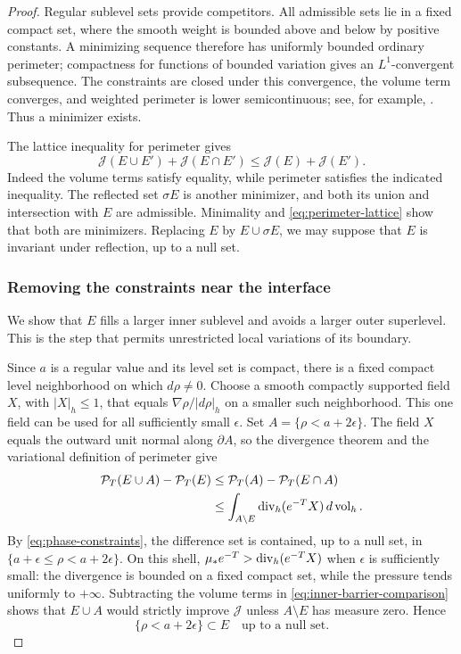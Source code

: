 \begin{proof}
Regular sublevel sets provide competitors.  All admissible sets lie
in a fixed compact set, where the smooth weight is bounded above and
below by positive constants.  A minimizing sequence therefore has
uniformly bounded ordinary perimeter; compactness for functions of
bounded variation gives an $L^1$-convergent subsequence.  The constraints
are closed under this convergence, the volume term converges, and
weighted perimeter is lower semicontinuous; see, for example,
\cite{Maggi2012}.  Thus a minimizer exists.

The lattice inequality for perimeter gives
\begin{equation}\label{eq:perimeter-lattice}
 \mathcal J(E\cup E')+\mathcal J(E\cap E')
 \le\mathcal J(E)+\mathcal J(E').
\end{equation}
Indeed the volume terms satisfy equality, while perimeter satisfies
the indicated inequality.  The reflected set $\sigma E$ is another
minimizer, and both its union and intersection with $E$ are admissible.
Minimality and \eqref{eq:perimeter-lattice} show that both are minimizers.
Replacing $E$ by $E\cup\sigma E$, we may suppose that $E$ is invariant
under reflection, up to a null set.

\subsubsection*{Removing the constraints near the interface}
We show that $E$ fills a larger inner sublevel and avoids a larger
outer superlevel.  This is the step that permits unrestricted local
variations of its boundary.

Since $a$ is a regular value and its level set is compact, there is a
fixed compact level neighborhood on which $d\rho\ne0$.  Choose a smooth
compactly supported field $X$, with $|X|_h\le1$, that equals
$\nabla\rho/|d\rho|_h$ on a smaller such neighborhood.  This one field
can be used for all sufficiently small $\epsilon$.  Set
$A=\{\rho<a+2\epsilon\}$.  The field $X$ equals the outward unit normal
along $\partial A$, so the divergence theorem and the variational
definition of perimeter give
\begin{align}
 \mathcal P_T(E\cup A)-\mathcal P_T(E)
 &\le\mathcal P_T(A)-\mathcal P_T(E\cap A)\notag\\
 &\le\int_{A\setminus E}\operatorname{div}_h(e^{-T}X)\,d\operatorname{vol}_h.
 \label{eq:inner-barrier-comparison}
\end{align}
By \eqref{eq:phase-constraints}, the difference set is contained, up
to a null set, in $\{a+\epsilon\le\rho<a+2\epsilon\}$.  On this shell,
$\mu_*e^{-T}>\operatorname{div}_h(e^{-T}X)$ when $\epsilon$ is sufficiently small:
the divergence is bounded on a fixed compact set, while the pressure
tends uniformly to $+\infty$.  Subtracting the volume terms in
\eqref{eq:inner-barrier-comparison} shows that $E\cup A$ would strictly
improve $\mathcal J$ unless $A\setminus E$ has measure zero.  Hence
\begin{equation}\label{eq:inner-phase-clearance}
 \{\rho<a+2\epsilon\}\subset E
 \quad\text{up to a null set}.
\end{equation}


\end{proof}
